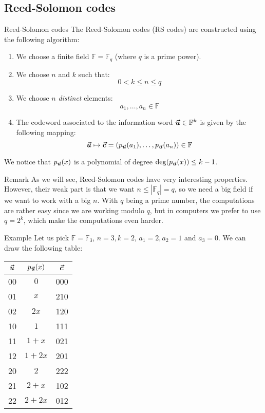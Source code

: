 \documentclass[a4paper]{article}
\begin{document}
\subsection{Reed-Solomon codes}
\begin{parag}{Reed-Solomon codes}
    The Reed-Solomon codes (RS codes) are constructed using the following algorithm:
    \begin{enumerate}
        \item We choose a finite field $\mathbb{F} = \mathbb{F}_q$ (where $q$ is a prime power).
        \item We choose $n$ and $k$ such that:  
        \[0 < k \leq n \leq q\]
        \item We choose $n$ \textit{distinct} elements: 
        \[a_1, \ldots, a_n \in \mathbb{F}\]
        \item The codeword associated to the information word $\bm{\protect\vec{u}} \in \mathbb{F}^k$ is given by the following mapping: 
            \[\bvec{u} \mapsto \bvec{c} = \left(p_{\bvec{u}}\left(a_1\right), \ldots, p_{\bvec{u}}\left(a_n\right)\right) \in \mathbb{F}\]
    \end{enumerate}
    
    We notice that $p_{\bvec{u}}\left(x\right)$ is a polynomial of degree $\deg\left(p_{\bvec{u}}\left(x\right)\right) \leq k - 1$.

    \begin{subparag}{Remark}
        As we will see, Reed-Solomon codes have very interesting properties. However, their weak part is that we want $n \leq \left|\mathbb{F}_q\right| = q$, so we need a big field if we want to work with a big $n$. With $q$ being a prime number, the computations are rather easy since we are working modulo $q$, but in computers we prefer to use $q = 2^k$, which make the computations even harder.

    \end{subparag}
    
\end{parag}

\begin{parag}{Example}
    Let us pick $\mathbb{F} = \mathbb{F}_3$, $n = 3, k = 2$, $a_1 = 2, a_2 = 1$ and $a_3 = 0$. We can draw the following table:
    \begin{center}
    \begin{tabular}{c|c|c}
        $\bm{\protect\vec{u}}$ & $p_{\bvec{u}}\left(x\right)$ & $\bm{\protect\vec{c}}$ \\
        \hline
        00 & $0$ & 000 \\
        01 & $x$ & 210 \\
        02 & $2x$ & 120 \\
        10 & $1$ & 111 \\
        11 & $1+x$ & 021 \\
        12 & $1+2x$ & 201 \\
        20 & $2$ & 222 \\
        21 & $2+x$ & 102 \\
        22 & $2+2x$ & 012
    \end{tabular}
    \end{center}
\end{parag}
\end{document}
